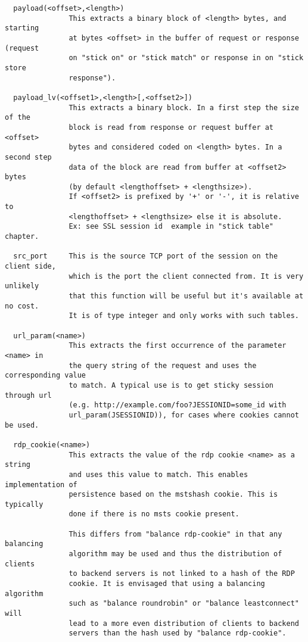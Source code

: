 \begin{verbatim}
  payload(<offset>,<length>)
               This extracts a binary block of <length> bytes, and starting
               at bytes <offset> in the buffer of request or response (request
               on "stick on" or "stick match" or response in on "stick store
               response").

  payload_lv(<offset1>,<length>[,<offset2>])
               This extracts a binary block. In a first step the size of the
               block is read from response or request buffer at <offset>
               bytes and considered coded on <length> bytes. In a second step
               data of the block are read from buffer at <offset2> bytes
               (by default <lengthoffset> + <lengthsize>).
               If <offset2> is prefixed by '+' or '-', it is relative to
               <lengthoffset> + <lengthsize> else it is absolute.
               Ex: see SSL session id  example in "stick table" chapter.

  src_port     This is the source TCP port of the session on the client side,
               which is the port the client connected from. It is very unlikely
               that this function will be useful but it's available at no cost.
               It is of type integer and only works with such tables.

  url_param(<name>)
               This extracts the first occurrence of the parameter <name> in
               the query string of the request and uses the corresponding value
               to match. A typical use is to get sticky session through url
               (e.g. http://example.com/foo?JESSIONID=some_id with
               url_param(JSESSIONID)), for cases where cookies cannot be used.

  rdp_cookie(<name>)
               This extracts the value of the rdp cookie <name> as a string
               and uses this value to match. This enables implementation of
               persistence based on the mstshash cookie. This is typically
               done if there is no msts cookie present.

               This differs from "balance rdp-cookie" in that any balancing
               algorithm may be used and thus the distribution of clients
               to backend servers is not linked to a hash of the RDP
               cookie. It is envisaged that using a balancing algorithm
               such as "balance roundrobin" or "balance leastconnect" will
               lead to a more even distribution of clients to backend
               servers than the hash used by "balance rdp-cookie".


\end{verbatim}
